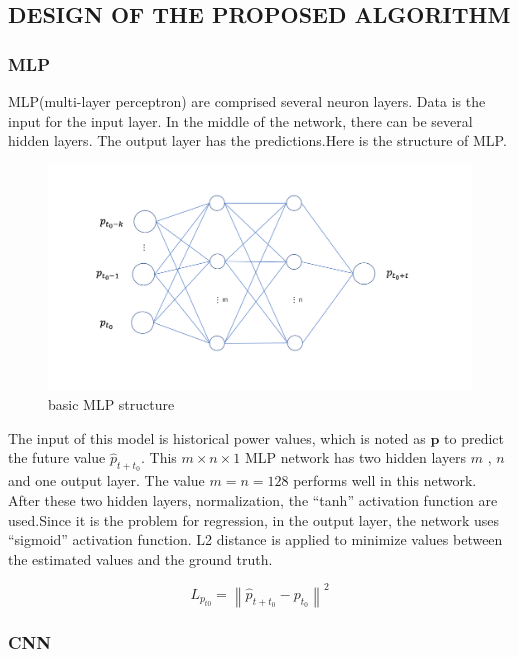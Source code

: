 \subsection{DESIGN OF THE PROPOSED ALGORITHM}


\subsubsection{MLP}
MLP(multi-layer perceptron) are comprised several neuron layers. Data is the input for the input layer. In the middle of the network, there can be several hidden layers. The output layer has the predictions.Here is the structure of MLP.

\begin{figure}[!ht]
	\centering
	\includegraphics[width=\textwidth]{mlp1.png}
	\caption{basic MLP structure\label{fig:mlp}}
\end{figure}



The input of this model is historical power values, which is noted as $\mathbf{p}$ to predict the future value $\hat{p}_{t+t_{0}}$. This $m\times n \times 1$ MLP network has two hidden layers $m$ , $n$ and one output layer. The value $m = n = 128$ performs well in this network. After these two hidden layers, normalization, the “tanh” activation function are used.Since it is the problem for regression, in the output layer, the network uses “sigmoid” activation function. L2 distance is applied to minimize values between the estimated values and the ground truth.

\begin{equation}
	L_{ p_{t0}}=\left \| \hat{p}_{t+t_{0}}- p_{t_{0}} \right \|  ^{2}
\end{equation}


\subsubsection{CNN}

